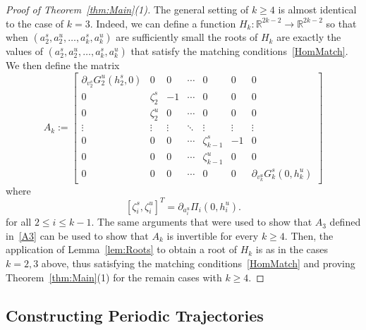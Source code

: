 \documentclass[11pt]{article}
\newcommand{\R}{\mathbb{R}}
\numberwithin{equation}{section}
\theoremstyle{plain}
\begin{document}
\begin{proof}[Proof of Theorem~\ref{thm:Main}(1)]
The general setting of $k \geq 4$ is almost identical to the case of $k = 3$. Indeed, we can define a function $H_k:\R^{2k-2}\to\R^{2k-2}$ so that when $(a^s_2,a^u_2,\dots,a^s_k,a^u_k)$ are sufficiently small the roots of $H_k$ are exactly the values of $(a^s_2,a^u_2,\dots,a^s_k,a^u_k)$ that satisfy the matching conditions~\eqref{HomMatch}. We then define the matrix 
\begin{equation}
		A_k:= \begin{bmatrix}
			\partial_{v^s_2}G^u_2(h^s_2,0) & 0 & 0 & \cdots & 0 & 0& 0 \\ 0 & \zeta^s_2 & -1 & \cdots & 0 & 0 & 0 \\ 0 & \zeta^u_2 & 0 & \cdots & 0 & 0 & 0 \\ 
			\vdots & \vdots & \vdots & \ddots & \vdots & \vdots & \vdots \\
			0 & 0 & 0 & \cdots & \zeta^s_{k-1} & -1 & 0\\
			0 & 0 & 0 & \cdots &\zeta^u_{k-1} & 0 & 0\\
			0 & 0 & 0 & \cdots & 0 & 0 & \partial_{v^u_k}G^s_k(0,h^u_k)
		\end{bmatrix}
\end{equation} 
where 
\begin{equation}\label{Zeta}
	[\zeta^s_i, \zeta^u_i]^T = \partial_{a^u_i}\Pi_i(0,h^u_i).	
\end{equation}
for all $2\leq i \leq k-1$. The same arguments that were used to show that $A_3$ defined in~\eqref{A3} can be used to show that $A_k$ is invertible for every $k \geq 4$. Then, the application of Lemma~\ref{lem:Roots} to obtain a root of $H_k$ is as in the cases $k = 2,3$ above, thus satisfying the matching conditions~\eqref{HomMatch} and proving Theorem~\ref{thm:Main}(1) for the remain cases with $k \geq 4$.  
\end{proof} %






\subsection{Constructing Periodic Trajectories}\label{subsec:Periodic}
\end{document}
